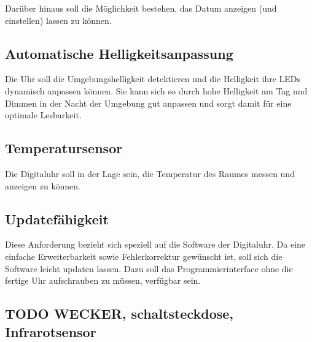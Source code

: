 Darüber hinaus soll die Möglichkeit bestehen, das Datum anzeigen (und einstellen) lassen zu können.
%
\subsection{Automatische Helligkeitsanpassung}
Die Uhr soll die Umgebungshelligkeit detektieren und die Helligkeit ihre LEDs dynamisch anpassen können. Sie kann sich so
durch hohe Helligkeit am Tag und Dimmen in der Nacht der Umgebung gut anpassen und sorgt damit für eine optimale Lesbarkeit.
%
\subsection{Temperatursensor}
Die Digitaluhr soll in der Lage sein, die Temperatur des Raumes messen und anzeigen zu können.
%
\subsection{Updatefähigkeit}
Diese Anforderung bezieht sich speziell auf die Software der Digitaluhr. Da eine einfache Erweiterbarkeit sowie Fehlerkorrektur
gewünscht ist, soll sich die Software leicht updaten lassen. Dazu soll das Programmierinterface ohne die fertige Uhr
aufschrauben zu müssen, verfügbar sein.
%
\subsection{TODO WECKER, schaltsteckdose, Infrarotsensor}
%
%
%